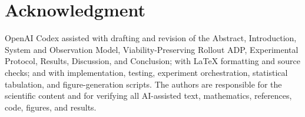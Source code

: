 \section*{Acknowledgment}
OpenAI Codex assisted with drafting and revision of the Abstract, Introduction,
System and Observation Model, Viability-Preserving Rollout ADP, Experimental
Protocol, Results, Discussion, and Conclusion; with LaTeX formatting and source
checks; and with implementation, testing, experiment orchestration, statistical
tabulation, and figure-generation scripts. The authors are responsible for the
scientific content and for verifying all AI-assisted text, mathematics,
references, code, figures, and results.
